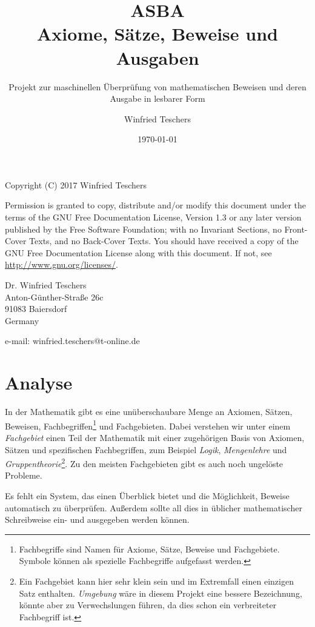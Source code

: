 \documentclass[english,ngerman,parskip=half,headsepline,footsepline]{scrreprt}
\title{ASBA\\Axiome, Sätze, Beweise und Ausgaben}
\subtitle{Projekt zur maschinellen Überprüfung von mathematischen Beweisen und deren Ausgabe in lesbarer Form}
\author{Winfried Teschers}
\date{\today}
\begin{document}
	\maketitle
	\tableofcontents	
	\vfill
	Copyright (C) 2017  Winfried Teschers
	
	\vspace{12pt}
	Permission is granted to copy, distribute and/or modify this document under the terms of the GNU Free Documentation License, Version 1.3 or any later version published by the Free Software Foundation; with no Invariant Sections, no Front-Cover Texts, and no Back-Cover Texts. You should have received a copy of the GNU Free Documentation License along with this document.  If not, see \url{http://www.gnu.org/licenses/}.
	\vspace{12pt}
	
	Dr. Winfried Teschers\\
	Anton-Günther-Straße 26c\\
	91083 Baiersdorf\\
	Germany
	
	e-mail: winfried.teschers@t-online.de\par
	
	\thispagestyle{scrheadings}
	
	
	
	\chapter{Analyse}
	\thispagestyle{scrheadings}
	
	In der Mathematik gibt es eine unüberschaubare Menge an Axiomen, Sätzen, Beweisen, Fachbegriffen\footnote{ Fachbegriffe sind Namen für Axiome, Sätze, Beweise und Fachgebiete. Symbole können als spezielle Fachbegriffe aufgefasst werden.} und Fachgebieten. Dabei verstehen wir unter einem \emph{Fachgebiet} einen Teil der Mathematik  mit einer zugehörigen Basis von Axiomen, Sätzen und spezifischen Fachbegriffen, zum Beispiel \emph{Logik}, \emph{Mengenlehre} und \emph{Gruppentheorie}\footnote{ Ein Fachgebiet kann hier sehr klein sein und im Extremfall einen einzigen Satz enthalten. \emph{Umgebung} wäre in diesem Projekt eine bessere Bezeichnung, könnte aber zu Verwechslungen führen, da dies schon ein verbreiteter Fachbegriff ist.}. Zu den meisten Fachgebieten gibt es auch noch ungelöste Probleme.
	
	Es fehlt ein System, das einen Überblick bietet und die Möglichkeit, Beweise automatisch zu überprüfen. Außerdem sollte all dies in üblicher mathematischer Schreibweise ein- und ausgegeben werden können.
	
\end{document}
